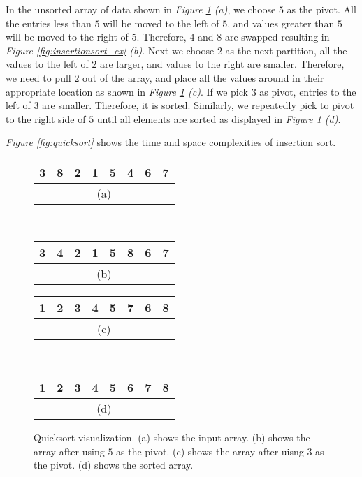 In the unsorted array of data shown in \textit{Figure \ref{fig:quicksort_ex} (a)}, we choose $5$ as the pivot. All the entries less than $5$ will be moved to the left of $5$, and values greater than $5$ will be moved to the right of $5$. Therefore, $4$ and $8$ are swapped resulting in \textit{Figure \ref{fig:insertionsort_ex} (b)}. Next we choose $2$ as the next partition, all the values to the left of $2$ are larger, and values to the right are smaller. Therefore, we need to pull $2$ out of the array, and place all the values around in their appropriate location as shown in \textit{Figure \ref{fig:quicksort_ex} (c)}. If we pick $3$ as pivot, entries to the left of $3$ are smaller. Therefore, it is sorted. Similarly, we repeatedly pick to pivot to the right side of $5$ until all elements are sorted as displayed in \textit{Figure \ref{fig:quicksort_ex} (d)}.

\textit{Figure \ref{fig:quicksort}} shows the time and space complexities of insertion sort.

\begin{figure}[!ht]
    \centering
    \begin{tabular}{|c|c|c|c|c|c|c|c|}
    \hline
    3 & 8 & 2 & 1 & \cellcolor{lightgray}5 & 4 & 6 & 7 \\
    \hline
    \multicolumn{8}{c}{(a)} \\
    \end{tabular}
    \,
    \begin{tabular}{|c|c|c|c|c|c|c|c|}
    \hline
    3 & 4 & \cellcolor{lightgray}2 & 1 & 5 & 8 & 6 & 7 \\
    \hline
    \multicolumn{8}{c}{(b)} \\
    \end{tabular}
    \break
    \begin{tabular}{|c|c|c|c|c|c|c|c|}
    \hline
    1 & 2 & \cellcolor{lightgray}3 & 4 & 5 & 7 & 6 & 8 \\
    \hline
    \multicolumn{8}{c}{(c)} \\
    \end{tabular}
    \,
    \begin{tabular}{|c|c|c|c|c|c|c|c|}
    \hline
    1 & 2 & 3 & 4 & 5 & 6 & 7 & 8 \\
    \hline
    \multicolumn{8}{c}{(d)} \\
    \end{tabular}
    
    \caption{Quicksort visualization. (a) shows the input array. (b) shows the array after using $5$ as the pivot. (c) shows the array after uisng 3 as the pivot. (d) shows the sorted array.}
    \label{fig:quicksort_ex}
\end{figure}

